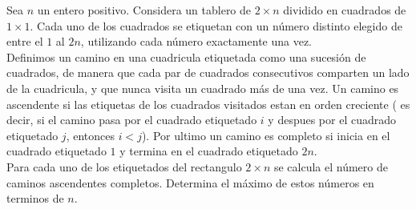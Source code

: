 \documentclass[11pt]{scrartcl}
\newcommand{\thmdifficulty}{0}
\newcommand{\problemdiff}[1]{\renewcommand{\thmdifficulty}{#1}}
\begin{document}
\problemdiff{5}
\begin{problem}
    Sea $n$ un entero positivo. Considera un tablero de $2\times n$ dividido en cuadrados de $1\times 1$. Cada uno de los cuadrados se etiquetan con un número distinto elegido de entre el $1$ al $2n$, utilizando cada número exactamente una vez.  \\
    Definimos un camino en una cuadricula etiquetada como una sucesión de cuadrados, de manera que cada par de cuadrados consecutivos comparten un lado de la cuadricula, y que nunca visita un cuadrado más de una vez. Un camino es ascendente si las etiquetas de los cuadrados visitados estan en orden creciente ( es decir, si el camino pasa por el cuadrado etiquetado $i$ y despues por el cuadrado etiquetado $j$, entonces $i<j$). 
    Por ultimo un camino es completo si inicia en el cuadrado etiquetado $1$ y termina en el cuadrado etiquetado $2n$. \\
    Para cada uno de los etiquetados del rectangulo $2\times n$ se calcula el número de caminos ascendentes completos. Determina el máximo de estos números en terminos de $n$. 
\end{problem}
\end{document}
